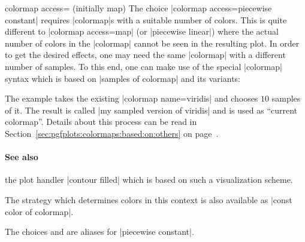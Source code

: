 \begin{pgfplotskey}{colormap access= (initially map)%
}
    The choice |colormap access=piecewise constant| requires |colormap|s with a
    suitable number of colors. This is quite different to |colormap access=map|
    (or |piecewise linear|) where the actual number of colors in the |colormap|
    cannot be seen in the resulting plot. In order to get the desired effects,
    one may need the same |colormap| with a different number of samples. To
    this end, one can make use of the special |colormap| syntax which is based
    on |samples of colormap| and its variants:

\begin{codeexample}[]
\end{codeexample}
    The example takes the existing |colormap name=viridis| and chooses $10$
    samples of it. The result is called |my sampled version of viridis| and is
    used as ``current colormap''. Details about this process can be read in
    Section~\ref{sec:pgfplots:colormaps:based:on:others} on
    page~\pageref{sec:pgfplots:colormaps:based:on:others}.


    \paragraph{See also}

    the plot handler |contour filled| which is based on such a visualization
    scheme.

    The strategy which determines colors in this context is also available as
    |const color of colormap|.

    The choices  and  are
    aliases for |piecewise constant|.
\end{pgfplotskey}
